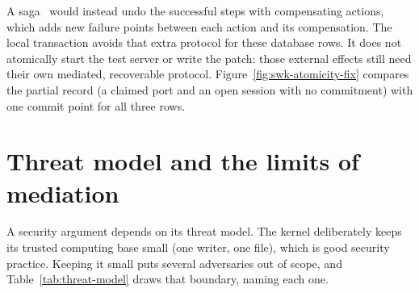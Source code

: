 \documentclass[11pt,a4paper]{article}
\theoremstyle{definition}
\theoremstyle{remark}
\begin{document}

A saga~ would instead undo the successful steps with
compensating actions, which adds new failure points between each action and its
compensation. The
local transaction avoids that extra protocol for these database rows. It does
not atomically start the test server or write the patch: those external
effects still need their own mediated, recoverable protocol.
Figure~\ref{fig:swk-atomicity-fix} compares the partial record (a claimed port
and an open session with no commitment) with one commit point for all three
rows.




\pdexercisepointer{\ref{ex:swk-partial-failure}}{\ref{ex:swk-op11-begin-work}}{\pageref{ex:swk-partial-failure}}

\section{Threat model and the limits of mediation}
\label{sec:threatmodel}

A security argument depends on its threat model. The kernel deliberately keeps
its trusted computing base small (one writer, one file), which is good security
practice. Keeping it small puts several adversaries out of scope, and
Table~\ref{tab:threat-model} draws that boundary, naming each one.
\end{document}
